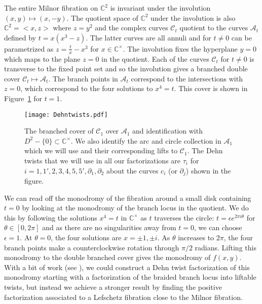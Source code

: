 \documentclass[11pt,letterpaper,reqno]{amsart}
\theoremstyle{remark}
\newcommand{\CC}{{\mathbb C}}
\def \A {\mathcal{A}}
\begin{document}
The entire Milnor fibration on $\CC^2$ is invariant under the involution $(x,y) \mapsto (x,-y)$. The quotient space of $\CC^2$ under the involution is also $\CC^2 =<x,z>$ where $z=y^2$ and the complex curves $\mathcal{C}_t$ quotient to the curves $\mathcal{A}_t$ defined by $t = x(x^3 -z)$. The latter curves are all annuli and for $t\neq0$ can be parametrized as $z = \frac t x -x^3$ for $x \in \CC^\times$. The involution fixes the hyperplane $y=0$ which maps to the plane $z=0$ in the quotient. Each of the curves $\mathcal{C}_t$ for $t\neq 0$ is transverse to the fixed point set and so the involution gives a branched double cover $\mathcal{C}_t \mapsto \mathcal{A}_t.$ The branch points in $\mathcal{A}_t$ correspond to the intersections with $z=0$, which correspond to the four solutions to $x^4 = t$. This cover is shown in Figure~\ref{fig:branched cover} for $t=1$.

\begin{figure}
    \centering
    \texttt{[image: Dehntwists.pdf]}
    \caption{The branched cover of $\mathcal{C}_1$ over $\A_1$ and identification with $D^2 -\{0\}\subset \CC^\times$. We also identify the arc and circle collection in $\A_1$ which we will use and their corresponding lifts to $\mathcal{C}_1$. The Dehn twists that we will use in all our factorizations are $\tau_i$ for $i = 1, 1', 2, 3, 4, 5, 5', \partial_1, \partial_2$ about the curves $c_i$ (or $\partial_j$) shown in the figure.}
    \label{fig:branched cover}
\end{figure}


We can read off the monodromy of the fibration around a small disk containing $t=0$ by looking at the monodromy of the branch locus in the quotient. We do this by following the solutions $x^4 = t$ in $\CC^\times$ as $t$ traverses the circle: $t = \epsilon e^{2\pi i \theta}$ for $\theta \in [0,2\pi]$ and as there are no singularities away from $t=0$, we can choose $\epsilon =1$. At $\theta = 0$, the four solutions are $x = \pm1,\pm i $. As $\theta$ increases to $2\pi$, the four branch points make a counterclockwise rotation through $\pi/2$ radians. Lifting this monodromy to the double branched cover gives the monodromy of $f(x,y)$. With a bit of work (see \cite{Keiko}), we could construct a Dehn twist factorization of this monodromy starting with a factorization of the braided branch locus into liftable twists, but instead we achieve a stronger result by finding the positive factorization associated to a Lefschetz fibration close to the Milnor fibration.
\end{document}
